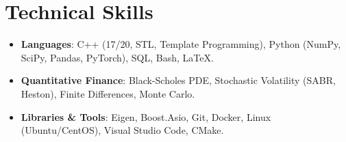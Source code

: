 \documentclass[10pt,letterpaper]{article}
\begin{document}
\section{Technical Skills}
\begin{itemize}[leftmargin=10pt]
    \item \textbf{Languages}: C++ (17/20, STL, Template Programming), Python (NumPy, SciPy, Pandas, PyTorch), SQL, Bash, LaTeX.
    \item \textbf{Quantitative Finance}: Black-Scholes PDE, Stochastic Volatility (SABR, Heston), Finite Differences, Monte Carlo.
    \item \textbf{Libraries \& Tools}: Eigen, Boost.Asio, Git, Docker, Linux (Ubuntu/CentOS), Visual Studio Code, CMake.
\end{itemize}
\end{document}
